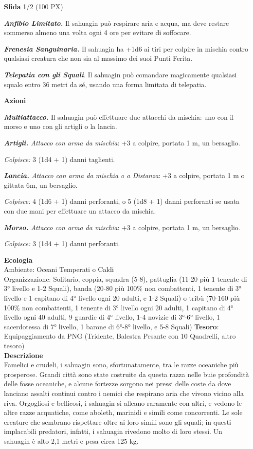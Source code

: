 \begin{multicols}{2}
\textbf{Sfida} 1/2 (100 PX)

\textit{\textbf{Anfibio Limitato.}} Il sahuagin può respirare aria e acqua, ma deve restare sommerso almeno una volta ogni 4 ore per evitare di soffocare.

\textit{\textbf{Frenesia Sanguinaria.}} Il sahuagin ha +1d6 ai tiri per colpire in mischia contro qualsiasi creatura che non sia al massimo dei suoi Punti Ferita.

\textit{\textbf{Telepatia con gli Squali}}. Il sahuagin può comandare magicamente qualsiasi squalo entro 36 metri da sé, usando una forma limitata di telepatia.

\textbf{Azioni}

\textit{\textbf{Multiattacco.}} Il sahuagin può effettuare due attacchi da mischia: uno con il morso e uno con gli artigli o la lancia.

\textit{\textbf{Artigli.} Attacco con arma da mischia}: +3 a colpire, portata 1 m, un bersaglio.

\textit{Colpisce:} 3 (1d4 + 1) danni taglienti.

\textit{\textbf{Lancia.} Attacco con arma da mischia o a Distanza}: +3 a colpire, portata 1 m o gittata 6m, un bersaglio.

\textit{Colpisce:} 4 (1d6 + 1) danni perforanti, o 5 (1d8 + 1) danni perforanti se usata con due mani per effettuare un attacco da mischia.

\textit{\textbf{Morso.} Attacco con arma da mischia}: +3 a colpire, portata 1 m, un bersaglio.

\textit{Colpisce:} 3 (1d4 + 1) danni perforanti.

\textbf{Ecologia}\\
Ambiente: Oceani Temperati o Caldi\\
Organizzazione: Solitario, coppia, squadra (5-8), pattuglia (11-20 più 1 tenente di 3° livello e 1-2 Squali), banda (20-80 più 100\% non combattenti, 1 tenente di 3° livello e 1 capitano di 4° livello ogni 20 adulti, e 1-2 Squali) o tribù (70-160 più 100\% non combattenti, 1 tenente di 3° livello ogni 20 adulti, 1 capitano di 4° livello ogni 40 adulti, 9 guardie di 4° livello, 1-4 novizie di 3°-6° livello, 1 sacerdotessa di 7° livello, 1 barone di 6°-8° livello, e 5-8 Squali)
\textbf{Tesoro}: Equipaggiamento da PNG (Tridente, Balestra Pesante con 10 Quadrelli, altro tesoro)\\
\textbf{Descrizione}\\
Famelici e crudeli, i sahuagin sono, sfortunatamente, tra le razze oceaniche più prosperose. Grandi città sono state costruite da questa razza nelle buie profondità delle fosse oceaniche, e alcune fortezze sorgono nei pressi delle coste da dove lanciano assalti continui contro i nemici che respirano aria che vivono vicino alla riva. Orgogliosi e bellicosi, i sahuagin si alleano raramente con altri, e vedono le altre razze acquatiche, come aboleth, marinidi e simili come concorrenti. Le sole creature che sembrano rispettare oltre ai loro simili sono gli squali; in questi implacabili predatori, infatti, i sahuagin rivedono molto di loro stessi. Un sahuagin è alto 2,1 metri e pesa circa 125 kg.


\end{multicols}
